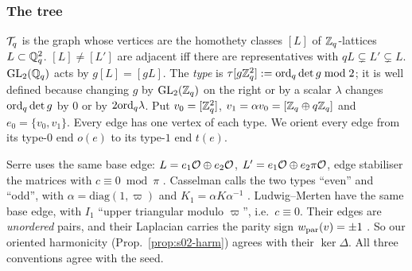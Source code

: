 \subsubsection*{The tree}
\begin{definition}\label{def:s02-tree}
$\mathcal{T}_q$ is the graph whose vertices are the homothety classes $[L]$ of $\mathbb{Z}_q$-lattices $L\subset\mathbb{Q}_q^2$.
$[L]\ne[L']$ are adjacent iff there are representatives with $qL\subsetneq L'\subsetneq L$.
$\mathrm{GL}_2(\mathbb{Q}_q)$ acts by $g[L]=[gL]$. The \emph{type} is $\tau[g\mathbb{Z}_q^2]:=\mathrm{ord}_q\det g\bmod 2$; it is well defined
because changing $g$ by $\mathrm{GL}_2(\mathbb{Z}_q)$ on the right or by a scalar $\lambda$ changes $\mathrm{ord}_q\det g$ by
$0$ or by $2\mathrm{ord}_q\lambda$.
Put $v_0=[\mathbb{Z}_q^2]$, $v_1=\alpha v_0=[\mathbb{Z}_q\oplus q\mathbb{Z}_q]$ and $e_0=\{v_0,v_1\}$. Every edge has one vertex of
each type. We orient every edge from its type-$0$ end $o(e)$ to its type-$1$ end $t(e)$.
\end{definition}
\begin{remark}\label{rem:s02-treeconv}
Serre uses the same base edge: $L=e_1\mathcal{O}\oplus e_2\mathcal{O}$, $L'=e_1\mathcal{O}\oplus e_2\pi\mathcal{O}$, edge stabiliser the
matrices with $c\equiv0\bmod\pi$ . Casselman calls the two types ``even'' and ``odd'', with $\alpha=\mathrm{diag}(1,\varpi)$ and
$K_1=\alpha K\alpha^{-1}$ .
Ludwig--Merten have the same base edge, with $I_1$ ``upper triangular modulo $\varpi$'', i.e.\ $c\equiv0$.
Their edges are \emph{unordered} pairs, and their Laplacian carries the parity sign $w_{\rm par}(v)=\pm1$
. So
our oriented harmonicity (Prop.~\ref{prop:s02-harm}) agrees with their $\ker\Delta$. All three conventions
agree with the seed.
\end{remark}

